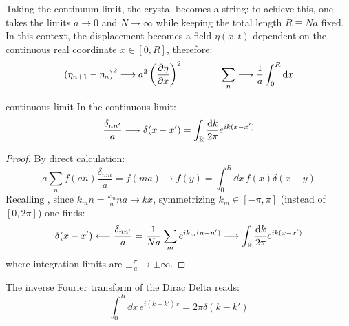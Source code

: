 Taking the continuum limit, the crystal becomes a string: to achieve this, one takes the limits $ a \rightarrow 0 $ and $ N \rightarrow \infty $ while keeping the total length $ R \equiv N a $ fixed. In this context, the displacement becomes a field $ \eta(x,t) $ dependent on the continuous real coordinate $ x \in [0, R] $, therefore:
\begin{equation*}
  \left( \eta_{n + 1} - \eta_n \right)^2 \longrightarrow a^2 \left( \frac{\partial \eta}{\partial x} \right)^2
  \qquad \qquad
  \sum_{n} \longrightarrow \frac{1}{a} \int_0^R \mathrm{d} x
\end{equation*}

\begin{proposition}{}{continuous-limit}
  In the continuous limit:
  \begin{equation*}
    \frac{\delta_{nn'}}{a} \longrightarrow \delta(x - x') = \int_{\mathbb{R}} \frac{\mathrm{d} k}{2\pi} e^{i k (x - x')}
  \end{equation*}
\end{proposition}

\begin{proofbox}
  \begin{proof}
  By direct calculation:
  \begin{equation*}
    a \sum_{n} f(an) \frac{\delta_{nm}}{a} = f(ma) \longrightarrow f(y) = \int_0^R \dd x\, f(x) \delta(x - y)
  \end{equation*}
  Recalling , since $ k_m n = \frac{k_m}{a} na \rightarrow k x $, symmetrizing $ k_m \in [-\pi, \pi] $ (instead of $ [0, 2\pi] $) one finds:
  \begin{equation*}
    \delta(x - x') \longleftarrow \frac{\delta_{nn'}}{a} = \frac{1}{Na} \sum_{m} e^{ik_m (n - n')} \longrightarrow \int_{\mathbb{R}} \frac{\mathrm{d} k}{2\pi} e^{ik (x - x')}
  \end{equation*}
  where integration limits are $ \pm \frac{\pi}{a} \rightarrow \pm \infty $.
\end{proof}
\end{proofbox}

\begin{proposition}{}{}
  The inverse Fourier transform of the Dirac Delta reads:
  \begin{equation*}
    \int_0^R \dd x\, e^{i (k - k') x} = 2\pi \delta(k - k')
  \end{equation*}
\end{proposition}

